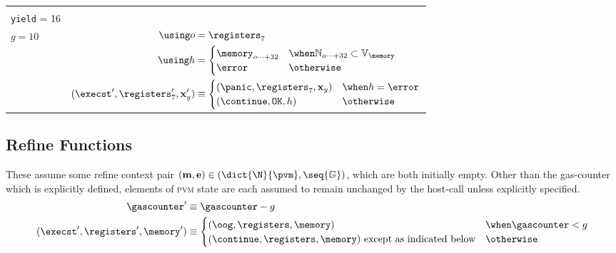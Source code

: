 \begin{longtable}{p{3.5cm} p{12.5cm}}
  \makecell*[l]{
  $\Omega_\Aries(\gascounter, \registers, \memory, (\mathbf{x}, \mathbf{y}))$ \\
  \texttt{yield} = 16 \\
  $g = 10$} &
  $\begin{aligned}
    \using o &= \registers_7 \\
    \using h &= \begin{cases}
      \memory_{o\dots+32} &\when \mathbb{N}_{o \dots+ 32} \subset \mathbb{V}_{\memory} \\
      \error &\otherwise
    \end{cases} \\
    (\execst', \registers'_7, \mathbf{x}'_y) &\equiv \begin{cases}
      (\panic, \registers_7, \mathbf{x}_y) &\when h = \error \\
      (\continue, \mathtt{OK}, h) &\otherwise \\
    \end{cases} \\
  \end{aligned}$\\
  \bottomrule
\end{longtable}

\subsection{Refine Functions}\label{sec:refinefunctions}

These assume some refine context pair $(\mathbf{m}, \mathbf{e}) \in (\dict{\N}{\pvm}, \seq{\mathbb{G}})$, which are both initially empty. Other than the gas-counter which is explicitly defined, elements of \textsc{pvm} state are each assumed to remain unchanged by the host-call unless explicitly specified.
\begin{align}
  \gascounter' &\equiv \gascounter - g\\
  (\execst', \registers', \memory') &\equiv \begin{cases}
    (\oog, \registers, \memory) &\when \gascounter < g\\
    (\continue, \registers, \memory) \text{ except as indicated below} &\otherwise
  \end{cases}
\end{align}

